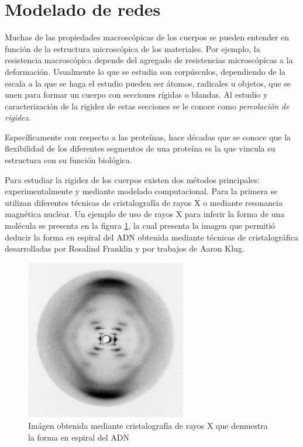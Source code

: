 \section{Modelado de redes}
Muchas de las propiedades macroscópicas de los cuerpos se pueden entender en función de la estructura microscópica\parencite{Jacobs1997}\parencite{Garboczi1985}\parencite{Guyon1990} de los materiales. Por ejemplo, la resistencia macroscópica depende del agregado de  resistencias microscópicas a la deformación. Usualmente lo que se estudia son corpúsculos, dependiendo de la escala a la que se haga el estudio pueden ser átomos, radicales u objetos, que se unen para formar un cuerpo con secciones rígidas o blandas. Al estudio y caracterización de la rigidez de estas secciones se le conoce como \emph{percolación de rigidez}.

Específicamente con respecto a las proteínas, hace décadas que se conoce que la flexibilidad de los diferentes segmentos de una proteína es la que vincula su estructura con su función biológica\parencite{Gerstein1994}.

Para estudiar la rigidez de los cuerpos existen dos métodos principales: experimentalmente y mediante modelado computacional. Para la primera se utilizan diferentes técnicas de cristalografía de rayos X o mediante resonancia magnética nuclear. Un ejemplo de uso de rayos X para inferir la forma de una molécula se presenta en la figura \ref{fig:dna}, la cual presenta la imagen que permitió deducir la forma en espiral del ADN obtenida mediante técnicas de cristalográfica desarrolladas por Rosalind Franklin y por trabajos de Aaron Klug.

\begin{figure}
\center
\includegraphics[width=70mm]{./images/adn}
\caption{Imágen obtenida mediante cristalografía de rayos X que demuestra la forma en espiral del ADN}
\label{fig:dna}
\end{figure}

